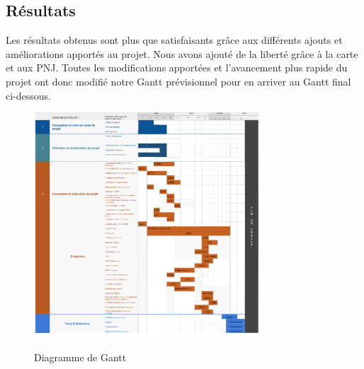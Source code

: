 \documentclass[12pt,a4paper, twoside]{article}
\begin{document}
\subsection{Résultats}
Les résultats obtenus sont plus que satisfaisants grâce aux différents ajouts et améliorations apportés au projet. Nous avons ajouté de la liberté grâce à la carte et aux PNJ. Toutes les modifications apportées et l'avancement plus rapide du projet ont donc modifié notre Gantt prévisionnel pour en arriver au Gantt final ci-dessous.
\begin{figure}[h]
    \centering
    \includegraphics[width=0.75\textwidth]{gantt finale.png}
    \label{fig:GANTT}
    \caption{Diagramme de Gantt}
\end{figure}
\end{document}
